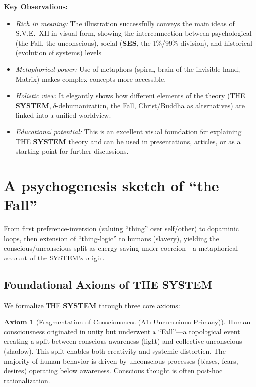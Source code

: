 \documentclass[11pt,a4paper]{article}
\newcommand{\SYSTEM}{\textbf{SYSTEM}}
\newcommand{\SES}{\textbf{SES}}
\newcommand{\deltaDehum}{$\delta$-dehumanization}
\theoremstyle{definition}
\newtheorem{axiom}{Axiom}[section]
\theoremstyle{remark}
\begin{document}
\textbf{Key Observations:}
\begin{itemize}
    \item \textit{Rich in meaning:} The illustration successfully conveys the main ideas of S.V.E.~XII in visual form, showing the interconnection between psychological (the Fall, the unconscious), social (\SES{}, the 1\%/99\% division), and historical (evolution of systems) levels.
    \item \textit{Metaphorical power:} Use of metaphors (spiral, brain of the invisible hand, Matrix) makes complex concepts more accessible.
    \item \textit{Holistic view:} It elegantly shows how different elements of the theory (THE \SYSTEM{}, \deltaDehum{}, the Fall, Christ/Buddha as alternatives) are linked into a unified worldview.
    \item \textit{Educational potential:} This is an excellent visual foundation for explaining THE \SYSTEM{} theory and can be used in presentations, articles, or as a starting point for further discussions.
\end{itemize}

\section{A psychogenesis sketch of ``the Fall''}
\label{app:fall}
From first preference-inversion (valuing ``thing'' over self/other) to dopaminic loops, then extension of ``thing-logic'' to humans (slavery), yielding the conscious/unconscious split as energy-saving under coercion---a metaphorical account of the SYSTEM’s origin. %


\subsection{Foundational Axioms of THE \SYSTEM{}}

We formalize THE \SYSTEM{} through three core axioms:

\begin{axiom}[Fragmentation of Consciousness (A1: Unconscious Primacy)]
\label{ax:fragmentation}
Human consciousness originated in unity but underwent a ``Fall''---a topological event creating a split between conscious awareness (light) and collective unconscious (shadow). This split enables both creativity and systemic distortion. The majority of human behavior is driven by unconscious processes (biases, fears, desires) operating below awareness. Conscious thought is often post-hoc rationalization.
\end{axiom}
\end{document}
